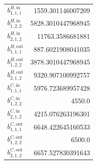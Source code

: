 \documentclass{article}%
\begin{document}
\begin{multicols*}{3}
\begin{supertabular}{lr}
	$b_{1,1,1}^{H,\text{in}}$ & 1559.301146007209 \\%
	$b_{1,2,2}^{H,\text{in}}$ & 5828.3010447968945 \\%
	$b_{2,1,2}^{H,\text{in}}$ & 11763.3586681881 \\%
	$b_{1,1,1}^{H,\text{out}}$ & 887.6021908041035 \\%
	$b_{1,2,2}^{H,\text{out}}$ & 3878.3010447968945 \\%
	$b_{2,1,2}^{H,\text{out}}$ & 9320.907100992757 \\%
	$b_{1,1,1}^{C,\text{in}}$ & 5976.723689957428 \\%
	$b_{1,2,2}^{C,\text{in}}$ & 4550.0 \\%
	$b_{2,1,2}^{C,\text{in}}$ & 4215.076263196301 \\%
	$b_{1,1,1}^{C,\text{out}}$ & 6648.422645160533 \\%
	$b_{1,2,2}^{C,\text{out}}$ & 6500.0 \\%
	$b_{2,1,2}^{C,\text{out}}$ & 6657.527830391643 \\%
\end{supertabular}%
\end{multicols*}%
\clearpage%
\end{document}
